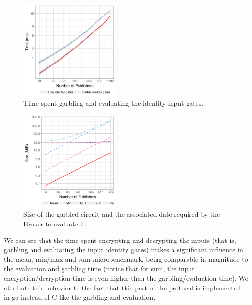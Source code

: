 \begin{figure}
  \includegraphics[width=0.45\textwidth]{plots/enc_dec.png}
  \caption{Time spent garbling and evaluating the identity input gates.}
  \label{micro-inputs}
\end{figure}



\begin{figure}
  \includegraphics[width=0.45\textwidth]{plots/size_log.png}
  \caption{Size of the garbled circuit and the associated date required by the
  Broker to evaluate it.}
  \label{micro-sizes}
\end{figure}

We can see that the time spent encrypting and decrypting the inputs (that is,
garbling and evaluating the input identity gates) makes a significant influence
in the mean, min/max and sum microbenchmark, being comparable in magnitude to
the evaluation and garbling time (notice that for sum, the input
encryption/decryption time is even higher than the garbling/evaluation time).
We attribute this behavior to the fact that this part of the protocol is
implemented in go instead of C like the garbling and evaluation.

